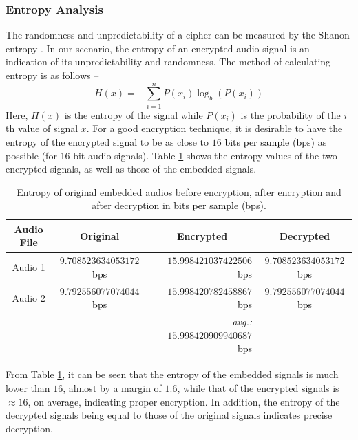 \documentclass[a4paper]{cas-sc}
\begin{document}
\subsubsection{Entropy Analysis}
The randomness and unpredictability of a cipher can be measured by the Shanon entropy \cite{shannon1948mathematical}. In our scenario, the entropy of an encrypted audio signal is an indication of its unpredictability and randomness. The method of calculating entropy is as follows --
\begin{equation}
    H(x)=-\sum_{i=1}^{n}P(x_i)\log_{b}(P(x_i))
\end{equation}
Here, $H(x)$ is the entropy of the signal while $P(x_i)$ is the probability of the $i$th value of signal $x$. For a good encryption technique, it is desirable to have the entropy of the encrypted signal to be as close to $16$ \textcolor{black}{bits per sample (bps)} as possible (for 16-bit audio signals). Table \ref{table:entropy} shows the entropy values of the two encrypted signals, as well as those of the embedded signals.
\begin{table}[pos=h]
    \begin{center}
        \caption{Entropy of original embedded audios before encryption, after encryption and after decryption in \textcolor{black}{bits per sample (bps)}.}
        \begin{tabular}{ccrc}
            \hline
            \multicolumn{1}{c|}{Audio File} & Original                                   & \multicolumn{1}{c}{Encrypted}                                       & Decrypted                                  \\ \hline
            \multicolumn{1}{c|}{Audio 1}    & $9.708523634053172$ \textcolor{black}{bps} & $15.998421037422506$ \textcolor{black}{bps}                         & $9.708523634053172$ \textcolor{black}{bps} \\
            \multicolumn{1}{c|}{Audio 2}    & $9.792556077074044$ \textcolor{black}{bps} & $15.998420782458867$ \textcolor{black}{bps}                         & $9.792556077074044$ \textcolor{black}{bps} \\ \hline
                                            &                                            & \textit{avg.:}$\mathbf{~15.998420909940687}$ \textcolor{black}{bps} &
        \end{tabular}
        \label{table:entropy}
    \end{center}
\end{table}

From Table \ref{table:entropy}, it can be seen that the entropy of the embedded signals is much lower than $16$, almost by a margin of $1.6$, while that of the encrypted signals is $\approx16$, on average, indicating proper encryption. In addition, the entropy of the decrypted signals being equal to those of the original signals indicates precise decryption.
\end{document}
